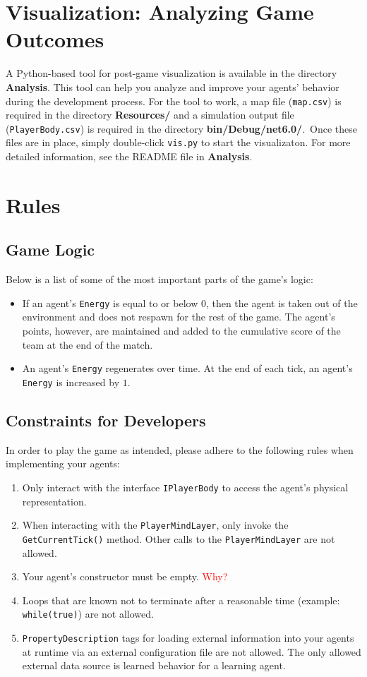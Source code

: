 \documentclass[
  a4paper,
  english,
  DIV=16,
  11pt,
  parskip=half,
  dvipsnames,
  listof=totoc,		     %
  index=totoc,		     %
  bibliography=totoc,	 %
]{scrartcl}
\newcommand\todo[1]{\textcolor{red}{#1}}
\begin{document}
\section{Visualization: Analyzing Game Outcomes} \label{sec:vis}
%
A Python-based tool for post-game visualization is available in the directory \textbf{Analysis}. This tool can help you analyze and improve your agents' behavior during the development process. For the tool to work, a map file (\texttt{map.csv}) is required in the directory \textbf{Resources/} and a simulation output file (\texttt{PlayerBody.csv}) is required in the directory \textbf{bin/Debug/net6.0/}.~Once these files are in place, simply double-click \texttt{vis.py} to start the visualizaton. For more detailed information, see the README file in \textbf{Analysis}.
%
%
\section{Rules} \label{sec:rules}
%
\subsection{Game Logic}
Below is a list of some of the most important parts of the game's logic:
%
\begin{itemize}
  \item If an agent's \texttt{Energy} is equal to or below 0, then the agent is taken out of the environment and does not respawn for the rest of the game. The agent's points, however, are maintained and added to the cumulative score of the team at the end of the match.
  \item An agent's \texttt{Energy} regenerates over time. At the end of each tick, an agent's \texttt{Energy} is increased by $1$.
\end{itemize}
%
\subsection{Constraints for Developers}
In order to play the game as intended, please adhere to the following rules when implementing your agents:
\begin{enumerate}
  \item Only interact with the interface \texttt{IPlayerBody} to access the agent's physical representation.
  \item When interacting with the \texttt{PlayerMindLayer}, only invoke the \texttt{GetCurrentTick()} method. Other calls to the \texttt{PlayerMindLayer} are not allowed.
  \item Your agent's constructor must be empty. \todo{Why?}
  \item Loops that are known not to terminate after a reasonable time (example: \texttt{while(true)}) are not allowed.
  \item \texttt{PropertyDescription} tags for loading external information into your agents at runtime via an external configuration file are not allowed. The only allowed external data source is learned behavior for a learning agent.
\end{enumerate}
%
\end{document}
